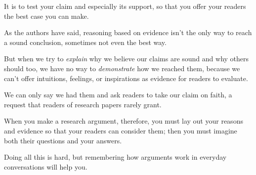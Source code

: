 \documentclass[oneside]{book}
\numberwithin{equation}{section}
\begin{document}
It is to test your claim and especially its support, so that you offer your readers the best case you can make.


%
As the authors have said, reasoning based on evidence isn't the only way to reach a sound conclusion, sometimes not even the best way.


But when we try to \textit{explain} why we believe our claims are sound and why others should too, we have no way to \textit{demonstrate} how we reached them, because we can't offer intuitions, feelings, or inspirations as evidence for readers to evaluate.

We can only say we had them and ask readers to take our claim on faith, a request that readers of research papers rarely grant.

%
When you make a research argument, therefore, you must lay out your reasons and evidence so that your readers can consider them; then you must imagine both their questions and your answers.

Doing all this is hard, but remembering how arguments work in everyday conversations will help you.
\end{document}
